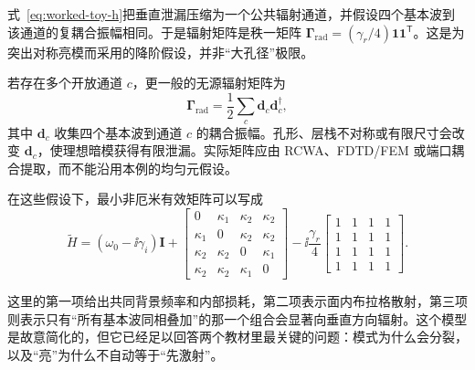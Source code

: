 \begin{ModelAssumptionBox}[辐射矩阵的均匀性假设]
式~\eqref{eq:worked-toy-h}把垂直泄漏压缩为一个公共辐射通道，并假设四个基本波到该通道的复耦合振幅相同。于是辐射矩阵是秩一矩阵 $\bm{\Gamma}_{\mathrm{rad}}=(\gamma_r/4)\bm{1}\bm{1}^{\mathsf T}$。这是为突出对称亮模而采用的降阶假设，并非“大孔径”极限。

若存在多个开放通道 $c$，更一般的无源辐射矩阵为
\begin{equation}
\bm{\Gamma}_{\mathrm{rad}}=
\frac{1}{2}\sum_c \bm d_c\bm d_c^\dagger,
\end{equation}
其中 $\bm d_c$ 收集四个基本波到通道 $c$ 的耦合振幅。孔形、层栈不对称或有限尺寸会改变 $\bm d_c$，使理想暗模获得有限泄漏。实际矩阵应由 RCWA、FDTD/FEM 或端口耦合提取，而不能沿用本例的均匀元假设。
\end{ModelAssumptionBox}

在这些假设下，最小非厄米有效矩阵可以写成
\begin{equation}
\tilde{H}
=
\left(\omega_0-\ii\gamma_i\right)\bm{I}
+
\begin{bmatrix}
0 & \kappa_1 & \kappa_2 & \kappa_2 \\
\kappa_1 & 0 & \kappa_2 & \kappa_2 \\
\kappa_2 & \kappa_2 & 0 & \kappa_1 \\
\kappa_2 & \kappa_2 & \kappa_1 & 0
\end{bmatrix}
-\ii\frac{\gamma_r}{4}
\begin{bmatrix}
1 & 1 & 1 & 1 \\
1 & 1 & 1 & 1 \\
1 & 1 & 1 & 1 \\
1 & 1 & 1 & 1
\end{bmatrix}.
\label{eq:worked-toy-h}
\end{equation}

这里的第一项给出共同背景频率和内部损耗，第二项表示面内布拉格散射，第三项则表示只有“所有基本波同相叠加”的那一个组合会显著向垂直方向辐射。这个模型是故意简化的，但它已经足以回答两个教材里最关键的问题：模式为什么会分裂，以及“亮”为什么不自动等于“先激射”。

